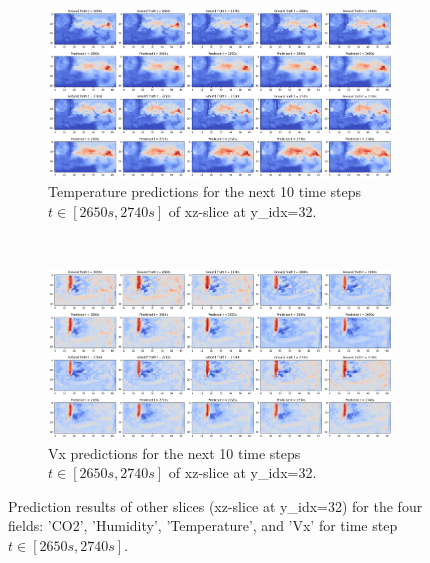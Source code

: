 \documentclass[final-report]{article-template}
\begin{document}
\clearpage

\begin{figure}[htbpt] \ContinuedFloat
    \renewcommand{\figurename}{Figure}
    \renewcommand{\thefigure}{B3}
    \begin{subfigure}[t]{0.99\textwidth}
        \centering
        \includegraphics[width=\textwidth]{figures/temp_10_2650_yidx.png}
        \caption{Temperature predictions for the next 10 time steps $t \in [2650s, 2740s]$ of xz-slice at y\_idx=32.}
        \label{fig:temp_10_2650_xz}
    \end{subfigure} \\[10mm]
    \begin{subfigure}[t]{0.99\textwidth}
        \centering
        \includegraphics[width=\textwidth]{figures/vx_10_2650_yidx.png}
        \caption{Vx predictions for the next 10 time steps $t \in [2650s, 2740s]$ of xz-slice at y\_idx=32.}
        \label{fig:vx_10_2650_xz}
    \end{subfigure}
    \label{fig:other_preds_xy_2}
    \caption{Prediction results of other slices (xz-slice at y\_idx=32) for the four fields: 'CO2', 'Humidity', 'Temperature', and 'Vx' for time step $t \in [2650s, 2740s]$.}
\end{figure}
\end{document}
